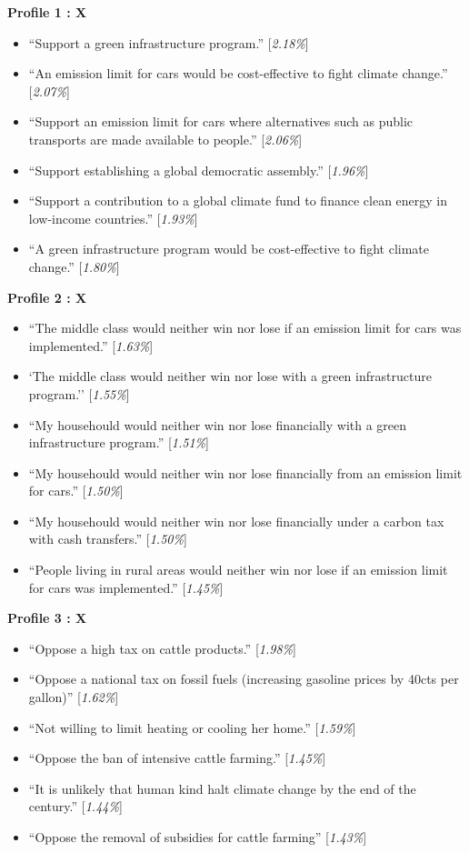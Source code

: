 \documentclass{article}
\begin{document}
\textbf{Profile 1 : X}
\begin{itemize}
\item ``Support a green infrastructure program.'' [\textit{2.18\%}]
\item ``An emission limit for cars would be cost-effective to fight climate change.'' [\textit{2.07\%}]
\item ``Support an emission limit for cars where alternatives such as public transports are made available to people.'' [\textit{2.06\%}]
\item ``Support establishing a global democratic assembly.'' [\textit{1.96\%}]
\item ``Support a contribution to a global climate fund to finance clean energy in low-income countries.'' [\textit{1.93\%}]
\item ``A green infrastructure program would be cost-effective to fight climate change.'' [\textit{1.80\%}]
\end{itemize}


\textbf{Profile 2 : X}
\begin{itemize}
\item ``The middle class would neither win nor lose if an emission limit for cars was implemented.'' [\textit{1.63\%}] 
\item `The middle class would neither win nor lose with a green infrastructure program.'' [\textit{1.55\%}]
\item ``My househould would neither win nor lose financially with a green infrastructure program.'' [\textit{1.51\%}]
\item ``My househould would neither win nor lose financially from an emission limit for cars.'' [\textit{1.50\%}]
\item ``My househould would neither win nor lose financially under a carbon tax with cash transfers.'' [\textit{1.50\%}]
\item ``People living in rural areas would neither win nor lose if an emission limit for cars was implemented.'' [\textit{1.45\%}]
\end{itemize}

\textbf{Profile 3 : X}
\begin{itemize}
\item ``Oppose a high tax on cattle products.'' [\textit{1.98\%}]
\item ``Oppose a national tax on fossil fuels (increasing gasoline prices by 40cts per gallon)'' [\textit{1.62\%}]
\item ``Not willing to limit heating or cooling her home.'' [\textit{1.59\%}]
\item ``Oppose the ban of intensive cattle farming.'' [\textit{1.45\%}]
\item ``It is unlikely that human kind halt climate change by the end of the century.'' [\textit{1.44\%}]
\item ``Oppose the removal of subsidies for cattle farming'' [\textit{1.43\%}]
\end{itemize}
\end{document}
